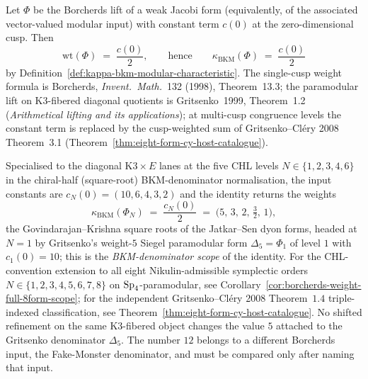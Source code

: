 \begin{theorem}[Borcherds weight formula
\texorpdfstring{$\mathrm{wt}(\Phi) = c(0)/2$}{wt(Phi) = c(0)/2},
specialised to the five CHL frame shapes; BKM-denominator scope;
\ClaimStatusProvedElsewhere]
\label{thm:borcherds-weight-kappa-BKM-universal}
Let $\Phi$ be the Borcherds lift of a weak Jacobi form (equivalently,
of the associated vector-valued modular input) with constant term
$c(0)$ at the zero-dimensional cusp. Then
\[
 \mathrm{wt}(\Phi) \;=\; \frac{c(0)}{2},
 \qquad\text{hence}\qquad
 \kappa_{\mathrm{BKM}}(\Phi) \;=\; \frac{c(0)}{2}
\]
by Definition~\ref{def:kappa-bkm-modular-characteristic}. The
single-cusp weight formula is Borcherds, \emph{Invent.\ Math.}~132
(1998), Theorem~13.3; the paramodular lift on K3-fibered diagonal
quotients is Gritsenko~1999, Theorem~1.2 (\emph{Arithmetical lifting
and its applications}); at multi-cusp congruence levels the constant
term is replaced by the cusp-weighted sum of Gritsenko--Cl\'ery 2008
Theorem~3.1 (Theorem~\ref{thm:eight-form-cy-host-catalogue}).

Specialised to the diagonal $\mathrm{K3} \times E$ lanes at the five
CHL levels $N \in \{1, 2, 3, 4, 6\}$ in the chiral-half (square-root)
BKM-denominator normalisation, the input constants are
$c_N(0) = (10, 6, 4, 3, 2)$ and the identity returns the weights
\[
 \kappa_{\mathrm{BKM}}(\Phi_N) \;=\; \frac{c_N(0)}{2}
 \;=\; \bigl(5,\, 3,\, 2,\, \tfrac{3}{2},\, 1\bigr),
\]
the Govindarajan--Krishna square roots of the Jatkar--Sen dyon forms,
headed at $N = 1$ by Gritsenko's weight-$5$ Siegel paramodular form
$\Delta_5 = \Phi_1$ of level $1$ with $c_1(0) = 10$; this is the
\emph{BKM-denominator scope} of the identity.
For the CHL-convention extension to all eight Nikulin-admissible
symplectic orders $N \in \{1, 2, 3, 4, 5, 6, 7, 8\}$ on
$\mathrm{Sp}_4$-paramodular, see
Corollary~\ref{cor:borcherds-weight-full-8form-scope}; for the
independent Gritsenko--Cl\'ery 2008 Theorem~$1.4$ triple-indexed
classification, see Theorem~\ref{thm:eight-form-cy-host-catalogue}.
No shifted refinement on the
same K3-fibered object changes the value $5$ attached to the
Gritsenko denominator $\Delta_5$. The number $12$ belongs to a different
Borcherds input, the Fake-Monster denominator, and must be compared only
after naming that input.
\end{theorem}

